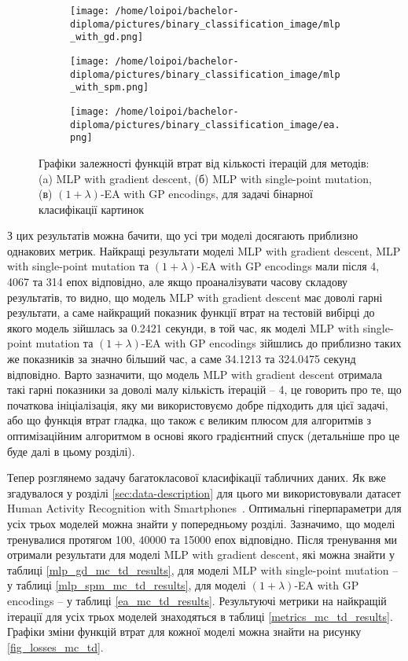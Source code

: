 \begin{figure}[ht]
	\centering
	\begin{subfigure}[b]{0.32\textwidth}    
		\texttt{[image: /home/loipoi/bachelor-diploma/pictures/binary\_classification\_image/mlp\_with\_gd.png]}
		\caption{}
	\end{subfigure}	
	\begin{subfigure}[b]{0.32\textwidth}
		\texttt{[image: /home/loipoi/bachelor-diploma/pictures/binary\_classification\_image/mlp\_with\_spm.png]}
		\caption{}
	\end{subfigure}	
	\begin{subfigure}[b]{0.32\textwidth}
		\texttt{[image: /home/loipoi/bachelor-diploma/pictures/binary\_classification\_image/ea.png]}
		\caption{}
	\end{subfigure}
	
	\caption{Графіки залежності функцій втрат від кількості ітерацій для методів: (a) MLP with gradient descent, (б) MLP with single-point mutation, (в) $(1+\lambda)$-EA with GP encodings, для задачі бінарної класифікації картинок}
	\label{fig_losses_bc_id}
\end{figure}

З цих результатів можна бачити, що усі три моделі досягають приблизно однакових метрик. Найкращі результати моделі MLP with gradient descent, MLP with single-point mutation та $(1+\lambda)$-EA with GP encodings мали після 4, 4067 та 314 епох відповідно, але якщо проаналізувати часову складову результатів, то видно, що модель MLP with gradient descent має доволі гарні результати, а саме найкращий показник функції втрат на тестовій вибірці до якого модель зійшлась за 0.2421 секунди, в той час, як моделі MLP with single-point mutation та $(1+\lambda)$-EA with GP encodings зійшлись до приблизно таких же показників за значно більший час, а саме 34.1213 та 324.0475 секунд відповідно. Варто зазначити, що модель MLP with gradient descent отримала такі гарні показники за доволі малу кількість ітерацій -- 4, це говорить про те, що початкова ініціалізація, яку ми використовуємо добре підходить для цієї задачі, або що функція втрат гладка, що також є великим плюсом для алгоритмів з оптимізаційним алгоритмом в основі якого градієнтний спуск (детальніше про це буде далі в цьому розділі).

Тепер розглянемо задачу багатокласової класифікації табличних даних. Як вже згадувалося у розділі \ref{sec:data-description} для цього ми використовували датасет Human Activity Recognition with Smartphones~\cite{ct31}. Оптимальні гіперпараметри для усіх трьох моделей можна знайти у попередньому розділі. Зазначимо, що моделі тренувалися протягом 100, 40000 та 15000 епох відповідно. Після тренування ми отримали результати для моделі MLP with gradient descent, які можна знайти у таблиці \ref{mlp_gd_mc_td_results}, для моделі MLP with single-point mutation -- у таблиці \ref{mlp_spm_mc_td_results}, для моделі $(1+\lambda)$-EA with GP encodings -- у таблиці \ref{ea_mc_td_results}. Результуючі метрики на найкращій ітерації для усіх трьох моделей знаходяться в таблиці \ref{metrics_mc_td_results}. Графіки зміни функцій втрат для кожної моделі можна знайти на рисунку \ref{fig_losses_mc_td}.

